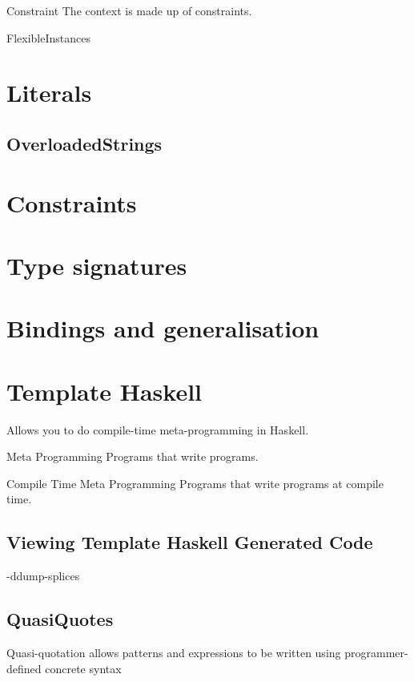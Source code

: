 \documentclass[openany, 12pt]{book}
\begin{document}
\begin{definition}{Constraint}{}
	The context is made up of constraints.
\end{definition}

FlexibleInstances

\part{Literals}
\chapter{OverloadedStrings}

\part{Constraints}
\part{Type signatures}
\part{Bindings and generalisation}
\part{Template Haskell}
Allows you to do compile-time meta-programming in Haskell.

\begin{definition}{Meta Programming}{}
	Programs that write programs.
\end{definition}

\begin{definition}{Compile Time Meta Programming}{}
	Programs that write programs at compile time.
\end{definition}

\setcounter{chapter}{2}
\chapter{Viewing Template Haskell Generated Code}
\begin{haskell}{}
-ddump-splices
\end{haskell}

\setcounter{chapter}{6}

\chapter{QuasiQuotes}
Quasi-quotation allows patterns and expressions to be written using
programmer-defined concrete syntax
\end{document}
